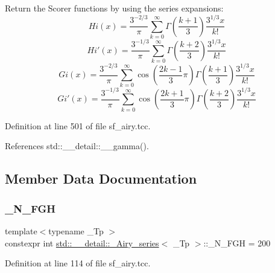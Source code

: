 Return the Scorer functions by using the series expansions\+: \[ Hi(x) = \frac{3^{-2/3}}{\pi} \sum_{k=0}^\infty \Gamma\left(\frac{k+1}{3}\right) \frac{3^{1/3}x}{k!} \] \[ Hi'(x) = \frac{3^{-1/3}}{\pi} \sum_{k=0}^\infty \Gamma\left(\frac{k+2}{3}\right) \frac{3^{1/3}x}{k!} \] \[ Gi(x) = \frac{3^{-2/3}}{\pi} \sum_{k=0}^\infty \cos\left(\frac{2k-1}{3}\pi\right) \Gamma\left(\frac{k+1}{3}\right) \frac{3^{1/3}x}{k!} \] \[ Gi'(x) = \frac{3^{-1/3}}{\pi} \sum_{k=0}^\infty \cos\left(\frac{2k+1}{3}\pi\right) \Gamma\left(\frac{k+2}{3}\right) \frac{3^{1/3}x}{k!} \] 

Definition at line 501 of file sf\+\_\+airy.\+tcc.



References std\+::\+\_\+\+\_\+detail\+::\+\_\+\+\_\+gamma().



\subsection{Member Data Documentation}
\mbox{\label{classstd_1_1____detail_1_1__Airy__series_a01e903f238d8c10c82cea4c115612ad8}} 
\subsubsection{\texorpdfstring{\+\_\+\+N\+\_\+\+F\+GH}{\_N\_FGH}}
{\footnotesize\ttfamily template$<$typename \+\_\+\+Tp $>$ \\
constexpr int \hyperlink{classstd_1_1____detail_1_1__Airy__series}{std\+::\+\_\+\+\_\+detail\+::\+\_\+\+Airy\+\_\+series}$<$ \+\_\+\+Tp $>$\+::\+\_\+\+N\+\_\+\+F\+GH = 200\hspace{0.3cm}{\ttfamily [static]}}



Definition at line 114 of file sf\+\_\+airy.\+tcc.

\mbox{\label{classstd_1_1____detail_1_1__Airy__series_a530108939a1c52d530e1d2ff577195b2}} 

